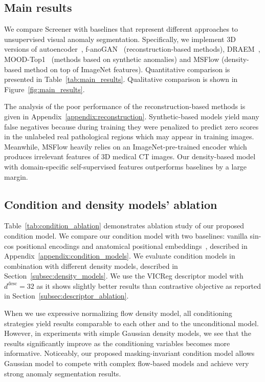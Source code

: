 


\subsection{Main results}

We compare Screener with baselines that represent different approaches to unsupervised visual anomaly segmentation. Specifically, we implement 3D versions of autoencoder~\cite{autoencoder}, f-anoGAN~\cite{fanogan} (reconstruction-based methods), DRAEM~\cite{draem}, MOOD-Top1~\cite{mood_top1} (methods based on synthetic anomalies) and MSFlow (density-based method on top of ImageNet features). Quantitative comparison is presented in Table~\ref{tab:main_results}. Qualitative comparison is shown in Figure~\ref{fig:main_results}.

The analysis of the poor performance of the reconstruction-based methods is given in Appendix~\ref{appendix:reconstruction}. Synthetic-based models yield many false negatives because during training they were penalized to predict zero scores in the unlabeled real pathological regions which may appear in training images. Meanwhile, MSFlow heavily relies on an ImageNet-pre-trained encoder which produces irrelevant features of 3D medical CT images. Our density-based model with domain-specific self-supervised features outperforms baselines by a large margin. %

\subsection{Condition and density models' ablation}

Table~\ref{tab:condition_ablation} demonstrates ablation study of our proposed condition model. We compare our condition model with two baselines: vanilla sin-cos positional encodings and anatomical positional embeddings~\cite{ape}, described in Appendix~\ref{appendix:condition_models}. We evaluate condition models in combination with different density models, described in Section~\ref{subsec:density_models}. We use the VICReg descriptor model with ${d^{\text{desc}} = 32}$ as it shows slightly better results than contrastive objective as reported in Section~\ref{subsec:descriptor_ablation}.

When we use expressive normalizing flow density model, all conditioning strategies yield results comparable to each other and to the unconditional model. However, in experiments with simple Gaussian density models, we see that the results significantly improve as the conditioning variables becomes more informative. Noticeably, our proposed masking-invariant condition model allows Gaussian model to compete with complex flow-based models and achieve very strong anomaly segmentation results.

